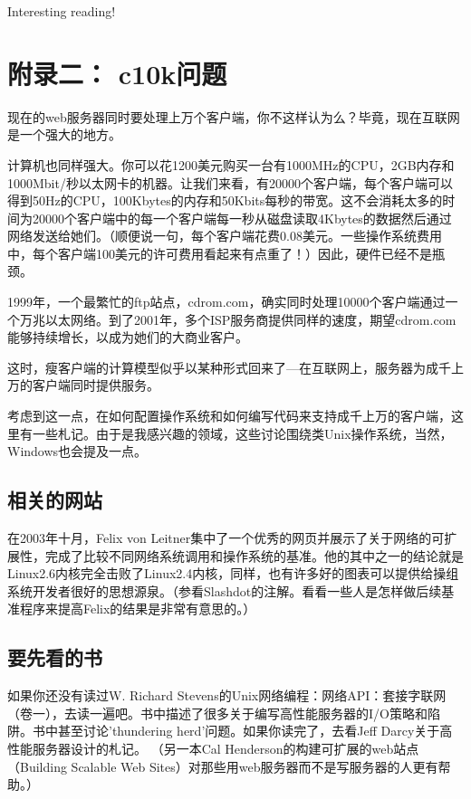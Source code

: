 \documentclass[12pt, twoside, a4paper, xetex]{report}
\begin{document}
Interesting reading!




\chapter{附录二： c10k问题}
	现在的web服务器同时要处理上万个客户端，你不这样认为么？毕竟，现在互联网是一个强大的地方。
	
	计算机也同样强大。你可以花1200美元购买一台有1000MHz的CPU，2GB内存和1000Mbit/秒以太网卡的机器。让我们来看，有20000个客户端，每个客户端可以得到50Hz的CPU，100Kbytes的内存和50Kbits每秒的带宽。这不会消耗太多的时间为20000个客户端中的每一个客户端每一秒从磁盘读取4Kbytes的数据然后通过网络发送给她们。（顺便说一句，每个客户端花费0.08美元。一些操作系统费用中，每个客户端100美元的许可费用看起来有点重了！）因此，硬件已经不是瓶颈。
	
	1999年，一个最繁忙的ftp站点，cdrom.com，确实同时处理10000个客户端通过一个万兆以太网络。到了2001年，多个ISP服务商提供同样的速度，期望cdrom.com能够持续增长，以成为她们的大商业客户。
	
	这时，瘦客户端的计算模型似乎以某种形式回来了---在互联网上，服务器为成千上万的客户端同时提供服务。
	
	考虑到这一点，在如何配置操作系统和如何编写代码来支持成千上万的客户端，这里有一些札记。由于是我感兴趣的领域，这些讨论围绕类Unix操作系统，当然，Windows也会提及一点。	

\section*{相关的网站}

	在2003年十月，Felix von Leitner集中了一个优秀的网页并展示了关于网络的可扩展性，完成了比较不同网络系统调用和操作系统的基准。他的其中之一的结论就是Linux2.6内核完全击败了Linux2.4内核，同样，也有许多好的图表可以提供给操组系统开发者很好的思想源泉。（参看Slashdot的注解。看看一些人是怎样做后续基准程序来提高Felix的结果是非常有意思的。）

\section*{要先看的书}

	如果你还没有读过W. Richard Stevens的Unix网络编程：网络API：套接字联网（卷一），去读一遍吧。书中描述了很多关于编写高性能服务器的I/O策略和陷阱。书中甚至讨论'thundering herd'问题。如果你读完了，去看Jeff Darcy关于高性能服务器设计的札记。
（另一本Cal Henderson的构建可扩展的web站点（Building Scalable Web Sites）对那些用web服务器而不是写服务器的人更有帮助。）
\end{document}

